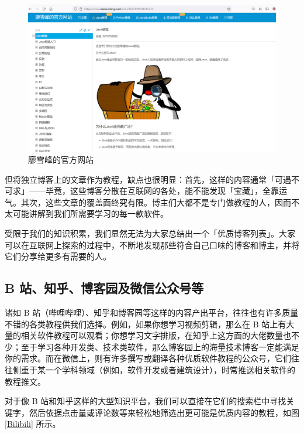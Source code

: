 \begin{figure}[htb!]
  \centering
  \includegraphics[width=12cm]{assets/Liao_Xuefeng.png}
  \caption{廖雪峰的官方网站}
  \label{Liao_Xuefeng}
\end{figure}

但将独立博客上的文章作为教程，缺点也很明显：首先，这样的内容通常「可遇不可求」——毕竟，这些博客分散在互联网的各处，能不能发现「宝藏」，全靠运气。其次，这些文章的覆盖面终究有限。博主们大都不是专门做教程的人，因而不太可能讲解到我们所需要学习的每一款软件。

受限于我们的知识积累，我们显然无法为大家总结出一个「优质博客列表」。大家可以在互联网上探索的过程中，不断地发现那些符合自己口味的博客和博主，并将它们分享给更多有需要的人。

\subsection{B 站、知乎、博客园及微信公众号等}

诸如 B 站（哔哩哔哩）、知乎和博客园等这样的内容产出平台，往往也有许多质量不错的各类教程供我们选择。例如，如果你想学习视频剪辑，那么在 B 站上有大量的相关软件教程可以观看；你想学习文字排版，在知乎上这方面的大佬数量也不少；至于学习各种开发类、技术类软件，那么博客园上的海量技术博客一定能满足你的需求。而在微信上，则有许多撰写或翻译各种优质软件教程的公众号，它们往往侧重于某一个学科领域（例如，软件开发或者建筑设计），时常推送相关软件的教程推文。

对于像 B 站和知乎这样的大型知识平台，我们可以直接在它们的搜索栏中寻找关键字，然后依据点击量或评论数等来轻松地筛选出更可能是优质内容的教程，如图 \ref{Bilibili} 所示。

